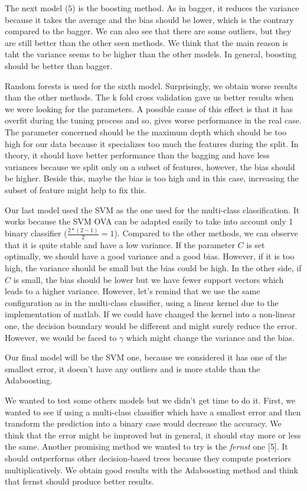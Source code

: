 \documentclass{article} %
\begin{document}
The next model ($5$) is the boosting method. As in bagger, it reduces the variance because it takes the average and the bias should be lower, which is the contrary compared to the bagger. We can also see that there are some outliers, but they are still better than the other seen methods. We think that the main reason is taht the variance seems to be higher than the other models. In general, boosting should be better than bagger.

Random forests is used for the sixth model. Surprisingly, we obtain worse results than the other methods. The k fold cross validation gave us better results when we were looking for the parameters. A possible cause of this effect is that it has overfit during the tuning process and so, gives worse performance in the real case. The parameter concerned should be the maximum depth which should be too high for our data because it specializes too much the features during the split. In theory, it should have better performance than the bagging and have less variances because we split only on a subset of features, however, the bias should be higher. Beside this, maybe the bias is too high and in this case, increasing the subset of feature might help to fix this.

Our last model used the SVM as the one used for the multi-class classification. It works because the SVM OVA can be adapted easily to take into account only 1 binary classifier ($\frac{2*(2-1)}{2}=1$). Compared to the other methods, we can observe that it is quite stable and have a low variance. If the parameter $C$ is set optimally, we should have a good variance and a good bias. However, if it is too high, the variance should be small but the bias could be high. In the other side, if $C$ is small, the bias should be lower but we have fewer support vectors which leads to a higher variance. However, let's remind that we use the same configuration as in the multi-class classifier, using a linear kernel due to the implementation of matlab. If we could have changed the kernel into a non-linear one, the decision boundary would be different and might surely reduce the error. However, we would be faced to $\gamma$ which might change the variance and the bias.

Our final model will be the SVM one, because we considered it has one of the smallest error, it doesn't have any outliers and is more stable than the Adaboosting.

We wanted to test some others models but we didn't get time to do it. First, we wanted to see if using a multi-class classifier which have a smallest error and then transform the prediction into a binary case would decrease the accuracy.  We think that the error might be improved but in general, it should stay more or less the same. Another promising method we wanted to try is the \textit{fernst} one [5]. It should outperforms other decision-based trees because they compute posteriors multiplicatively. We obtain good results with the Adaboosting method and think that fernst should produce better results.
\end{document}
